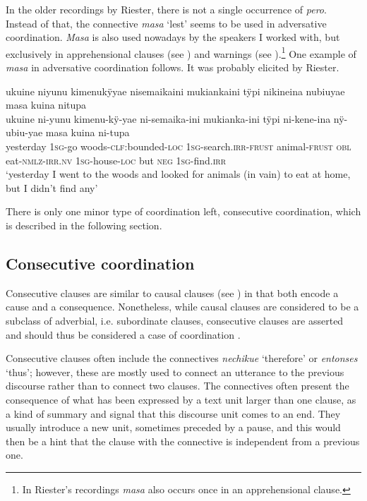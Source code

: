 In the older recordings by Riester, there is not a single occurrence of \textit{pero}. Instead of that, the connective \textit{masa} ‘lest’ seems to be used in adversative coordination. \textit{Masa} is also used nowadays by the speakers I worked with, but exclusively in apprehensional clauses (see ) and warnings (see ).\footnote{In Riester’s recordings \textit{masa} also occurs once in an apprehensional clause.} One example of \textit{masa} in adversative coordination follows. It was probably elicited by Riester.


\ea\label{ex:masa-but}
\begingl
\glpreamble ukuine niyunu kimenukÿyae nisemaikaini mukiankaini tÿpi nikineina nubiuyae masa kuina nitupa\\
\gla ukuine ni-yunu kimenu-kÿ-yae ni-semaika-ini mukianka-ini tÿpi ni-kene-ina nÿ-ubiu-yae masa kuina ni-tupa\\
\glb yesterday 1\textsc{sg}-go woods-\textsc{clf:}bounded-\textsc{loc} 1\textsc{sg}-search.\textsc{irr}-\textsc{frust} animal-\textsc{frust} \textsc{obl} eat-\textsc{nmlz}-\textsc{irr.nv} 1\textsc{sg}-house-\textsc{loc} but \textsc{neg} 1\textsc{sg}-find.\textsc{irr}\\
\glft ‘yesterday I went to the woods and looked for animals (in vain) to eat at home, but I didn’t find any’
\endgl
\trailingcitation{[nxx-a630101g-1.62]}
\xe
{}

There is only one minor type of coordination left, consecutive coordination, which is described in the following section.

\subsection{Consecutive coordination}\label{sec:ConsecutiveCoordination}

Consecutive clauses are similar to causal clauses (see ) in that both encode a cause and a consequence. Nonetheless, while causal clauses are considered to be a subclass of adverbial, i.e. subordinate clauses, consecutive clauses are asserted and should thus be considered a case of coordination \citep[cf.][38]{Cristofaro2003}.

Consecutive clauses often include the connectives \textit{nechikue} ‘therefore’ or \textit{entonses} ‘thus’; however, these are mostly used to connect an utterance to the previous discourse rather than to connect two clauses. The connectives often present the consequence of what has been expressed by a text unit larger than one clause, as a kind of summary and signal that this discourse unit comes to an end. They usually introduce a new  unit, sometimes preceded by a pause, and this would then be a hint that the clause with the connective is independent from a previous one. 

